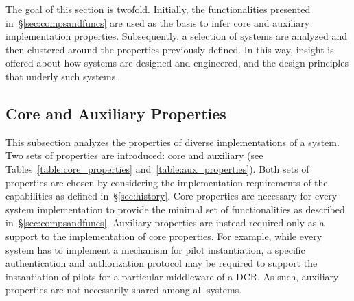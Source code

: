 \documentclass{sig-alternate}
\begin{document}

The goal of this section is twofold. Initially, the \pilot functionalities
presented in~\S\ref{sec:compsandfuncs} are used as the basis to infer core and
auxiliary \pilot implementation properties. Subsequently, a selection of \pilot
systems are analyzed and then clustered around the properties previously
defined. In this way, insight is offered about how \pilot systems are designed
and engineered, and the design principles that underly such systems.


 

%
\subsection{Core and Auxiliary Properties}
\label{sec:properties}

This subsection analyzes the properties of diverse implementations of a \pilot
system. Two sets of properties are introduced: core and auxiliary (see
Tables~\ref{table:core_properties} and~\ref{table:aux_properties}). Both sets of
properties are chosen by considering the implementation requirements of the
\pilot capabilities as defined in~\S\ref{sec:history}. Core properties are
necessary for every \pilot system implementation to provide the minimal set of
functionalities as described in~\S\ref{sec:compsandfuncs}. Auxiliary properties
are instead required only as a support to the implementation of core properties.
For example, while every \pilot system has to implement a mechanism for pilot
instantiation, a specific authentication and authorization protocol may be
required to support the instantiation of pilots for a particular middleware of a
DCR. As such, auxiliary properties are not necessarily shared among all \pilot
systems.

\end{document}
